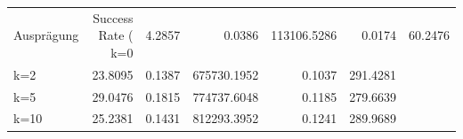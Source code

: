 \begin{tabular}{lrrrrr}
\toprule
Ausprägung & Success Rate (%
\midrule
k=0 & 4.2857 & 0.0386 & 113106.5286 & 0.0174 & 60.2476 \\
k=2 & 23.8095 & 0.1387 & 675730.1952 & 0.1037 & 291.4281 \\
k=5 & 29.0476 & 0.1815 & 774737.6048 & 0.1185 & 279.6639 \\
k=10 & 25.2381 & 0.1431 & 812293.3952 & 0.1241 & 289.9689 \\
\bottomrule
\end{tabular}
